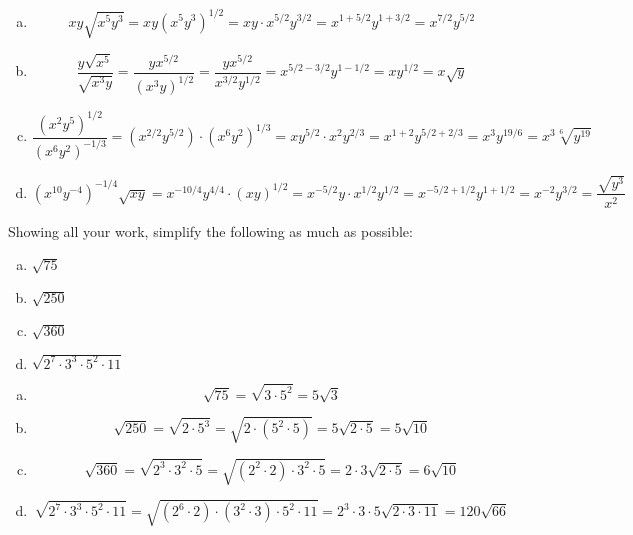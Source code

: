 \documentclass[11pt,letterpaper]{article}
\begin{document}
\sol
\begin{enumerate}[(a)]
\item 
	\[
	xy\sqrt{x^5y^3}= xy (x^5 y^3)^{1/2}= xy \cdot x^{5/2} y^{3/2}= x^{1 + 5/2} y^{1 + 3/2}= x^{7/2} y^{5/2}
	\] \pspace

\item 
	\[
	\dfrac{y \sqrt{x^5}}{\sqrt{x^3y}}= \dfrac{y x^{5/2}}{(x^3 y)^{1/2}}= \dfrac{y x^{5/2}}{x^{3/2} y^{1/2}}= x^{5/2 - 3/2} y^{1 - 1/2}= x y^{1/2}= x \sqrt{y}
	\] \pspace

\item 
	\[
	\dfrac{(x^2 y^5)^{1/2}}{(x^6 y^{2})^{-1/3}}= (x^{2/2} y^{5/2}) \cdot (x^6 y^2)^{1/3}= xy^{5/2} \cdot x^2 y^{2/3}= x^{1 + 2} y^{5/2 + 2/3}= x^3 y^{19/6}= x^3 \sqrt[6]{y^{19}}
	\] \pspace

\item 
	\[
	(x^{10} y^{-4})^{-1/4} \sqrt{xy}= x^{-10/4} y^{4/4} \cdot (xy)^{1/2}= x^{-5/2} y \cdot x^{1/2} y^{1/2}= x^{-5/2 + 1/2} y^{1 + 1/2}= x^{-2} y^{3/2}= \dfrac{\sqrt{y^3}}{x^2}
	\] 
\end{enumerate}



\newpage



 Showing all your work, simplify the following as much as possible:
        \begin{enumerate}[(a)]
        \item $\sqrt{75}$
        \item $\sqrt{250}$
        \item $\sqrt{360}$
        \item $\sqrt{2^7 \cdot 3^3 \cdot 5^2 \cdot 11}$
        \end{enumerate} \pspace

\sol
\begin{enumerate}[(a)]
\item 
	\[
	\sqrt{75}= \sqrt{3 \cdot 5^2}= 5 \sqrt{3}
	\] \pspace

\item 
	\[
	\sqrt{250}= \sqrt{2 \cdot 5^3}= \sqrt{2 \cdot (5^2 \cdot 5)}= 5 \sqrt{2 \cdot 5}= 5 \sqrt{10}
	\] \pspace

\item 
	\[
	\sqrt{360}= \sqrt{2^3 \cdot 3^2 \cdot 5}= \sqrt{(2^2 \cdot 2) \cdot 3^2 \cdot 5}= 2 \cdot 3 \sqrt{2 \cdot 5}= 6 \sqrt{10}
	\] \pspace

\item 
	\[
	\sqrt{2^7 \cdot 3^3 \cdot 5^2 \cdot 11}= \sqrt{(2^6 \cdot 2) \cdot (3^2 \cdot 3) \cdot 5^2 \cdot 11}= 2^3 \cdot 3 \cdot 5 \sqrt{2 \cdot 3 \cdot 11}= 120 \sqrt{66}
	\]
\end{enumerate}
\end{document}
